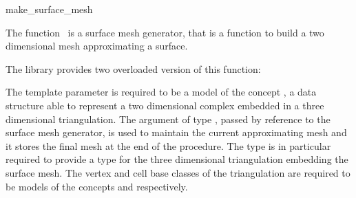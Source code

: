 

\begin{ccRefFunction}{make_surface_mesh}  %



\ccDefinition
  
The function \ccRefName\ is a surface mesh generator,
that is a function to build a two dimensional mesh 
approximating  a surface.

The library provides two overloaded version 
of this function:








\ccParameters
The template parameter  
is required to be a model of the concept
,
a data structure able to represent a two dimensional
complex  embedded in a three dimensional triangulation.
The argument  of type ,  passed by reference
to the surface mesh generator, 
is used to maintain  the current approximating mesh and it stores
the final mesh at the end of the procedure.
The type  is in particular required to
provide a type 
for the three dimensional triangulation
embedding the surface mesh.
The vertex and cell base classes of the triangulation
 are required
to be  models  of the concepts 
 and 
 respectively.



\end{ccRefFunction}
